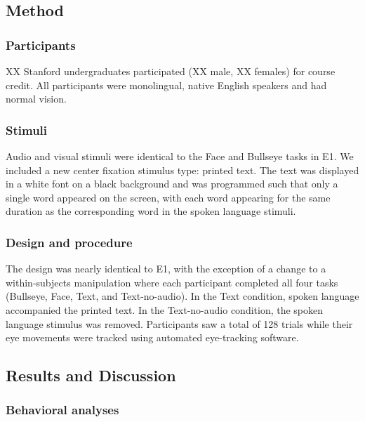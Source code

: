 \documentclass[10pt, letterpaper]{article}
\begin{document}
\subsection{Method}\label{method-1}

\subsubsection{Participants}\label{participants-1}

XX Stanford undergraduates participated (XX male, XX females) for course
credit. All participants were monolingual, native English speakers and
had normal vision.

\subsubsection{Stimuli}\label{stimuli-1}

Audio and visual stimuli were identical to the Face and Bullseye tasks
in E1. We included a new center fixation stimulus type: printed text.
The text was displayed in a white font on a black background and was
programmed such that only a single word appeared on the screen, with
each word appearing for the same duration as the corresponding word in
the spoken language stimuli.

\subsubsection{Design and procedure}\label{design-and-procedure-1}

The design was nearly identical to E1, with the exception of a change to
a within-subjects manipulation where each participant completed all four
tasks (Bullseye, Face, Text, and Text-no-audio). In the Text condition,
spoken language accompanied the printed text. In the Text-no-audio
condition, the spoken language stimulus was removed. Participants saw a
total of 128 trials while their eye movements were tracked using
automated eye-tracking software.

\subsection{Results and Discussion}\label{results-and-discussion-1}

\subsubsection{Behavioral analyses}\label{behavioral-analyses-1}
\end{document}
